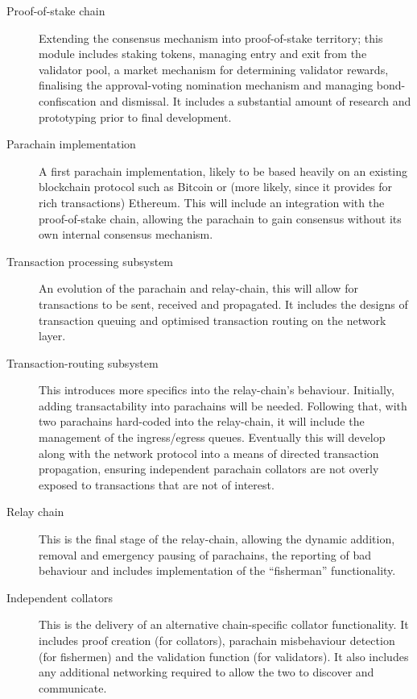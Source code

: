 \documentclass[t,usepdftitle=false]{beamer}
\begin{document}
\begin{frame}
\begin{description}
\item[Proof-of-stake chain] Extending the consensus mechanism into proof-of-stake territory; this module includes  staking tokens, managing entry and exit from the validator pool, a market mechanism for determining validator rewards, finalising the approval-voting nomination mechanism and managing bond-confiscation and dismissal. It includes a substantial amount of research and prototyping prior to final development.

\item[Parachain implementation] A first parachain implementation, likely to be based heavily on an existing blockchain protocol such as Bitcoin or (more likely, since it provides for rich transactions) Ethereum. This will include an integration with the proof-of-stake chain, allowing the parachain to gain consensus without its own internal consensus mechanism.

\item[Transaction processing subsystem] An evolution of the parachain and relay-chain, this will allow for transactions to be sent, received and propagated. It includes the designs of transaction queuing and optimised transaction routing on the network layer.

\item[Transaction-routing subsystem] This introduces more specifics into the relay-chain's behaviour. Initially, adding transactability into parachains will be needed. Following that, with two parachains hard-coded into the relay-chain, it will include the management of the ingress/egress queues. Eventually this will develop along with the network protocol into a means of directed transaction propagation, ensuring independent parachain collators are not overly exposed to transactions that are not of interest.

\item[Relay chain] This is the final stage of the relay-chain, allowing the dynamic addition, removal and emergency pausing of parachains, the reporting of bad behaviour and includes implementation of the ``fisherman'' functionality.

\item[Independent collators] This is the delivery of an alternative chain-specific collator functionality. It includes proof creation (for collators), parachain misbehaviour detection (for fishermen) and the validation function (for validators). It also includes any additional networking required to allow the two to discover and communicate.


\end{description}
\end{frame}
\end{document}
